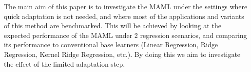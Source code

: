 The main aim of this paper is to investigate the MAML under the settings where quick adaptation is not needed, and where most of the applications and variants of this method are benchmarked. This will be achieved by looking at the expected performance of the MAML under 2 regression scenarios, and comparing its performance to conventional base learners (\eg Linear Regression, Ridge Regression, Kernel Ridge Regression, etc.). By doing this we aim to investigate the effect of the limited adaptation step.%


